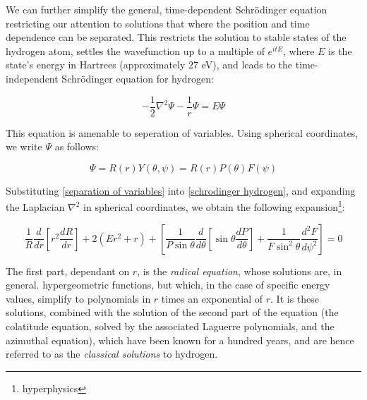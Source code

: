 \documentclass{article}
\begin{document}
We can further simplify the general, time-dependent Schr\"odinger equation
restricting our attention to solutions that where the position and
time dependence can be separated.
This restricts the solution to stable states
of the hydrogen atom, settles the wavefunction up to a multiple of $e^{itE}$,
where $E$ is the state's energy in Hartrees (approximately 27 eV),
and leads to the time-independent Schr\"odinger equation for hydrogen:

\begin{equation}
\label{schrodinger hydrogen}
-\frac{1}{2}\nabla^2 \Psi - \frac{1}{r}\Psi = E \Psi
\end{equation}

This equation is amenable to seperation of variables.
Using spherical coordinates, we write $\Psi$ as follows:

\begin{equation}
\label{separation of variables}
\Psi=R(r)Y(\theta, \psi) = R(r)P(\theta)F(\psi)
\end{equation}

Substituting \eqref{separation of variables} into \eqref{schrodinger hydrogen},
and expanding the Laplacian $\nabla^2$ in spherical coordinates,
we obtain the following expansion\footnote{hyperphysics}:

\begin{equation*}
\frac{1}{R} \frac{d}{dr}\left[ r^2 \frac{dR}{dr}\right] + 2(Er^2 + r)
+ \left[\frac{1}{P\sin\theta} \frac{d}{d\theta}\left[\sin\theta\frac{dP}{d\theta}\right]+\frac{1}{F\sin^2\theta}\frac{d^2 F}{d\psi^2}\right] = 0
\end{equation*}

The first part, dependant on $r$, is the {\it radical equation}, whose solutions are, in general.
hypergeometric functions, but which, in the case of specific energy values,
simplify to polynomials in $r$
times an exponential of $r$.  It is these solutions, combined with the solution
of the second part of the equation (the colatitude equation, solved by the associated Laguerre polynomials,
and the azimuthal equation), which have been known for a hundred years, and are
hence referred to as the {\it classical solutions} to hydrogen.
\end{document}
